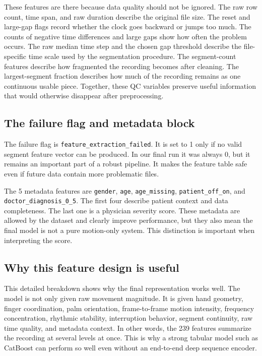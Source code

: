 \documentclass[10pt,twocolumn]{article}
\begin{document}
These features are there because data quality should not be ignored. The raw row count, time span, and raw duration describe the original file size. The reset and large-gap flags record whether the clock goes backward or jumps too much. The counts of negative time differences and large gaps show how often the problem occurs. The raw median time step and the chosen gap threshold describe the file-specific time scale used by the segmentation procedure. The segment-count features describe how fragmented the recording becomes after cleaning. The largest-segment fraction describes how much of the recording remains as one continuous usable piece. Together, these QC variables preserve useful information that would otherwise disappear after preprocessing.

\subsection{The failure flag and metadata block}
The failure flag is \texttt{feature\_extraction\_failed}. It is set to 1 only if no valid segment feature vector can be produced. In our final run it was always 0, but it remains an important part of a robust pipeline. It makes the feature table safe even if future data contain more problematic files.

The 5 metadata features are \texttt{gender}, \texttt{age}, \texttt{age\_missing}, \texttt{patient\_off\_on}, and \texttt{doctor\_diagnosis\_0\_5}. The first four describe patient context and data completeness. The last one is a physician severity score. These metadata are allowed by the dataset and clearly improve performance, but they also mean the final model is not a pure motion-only system. This distinction is important when interpreting the score.

\subsection{Why this feature design is useful}
This detailed breakdown shows why the final representation works well. The model is not only given raw movement magnitude. It is given hand geometry, finger coordination, palm orientation, frame-to-frame motion intensity, frequency concentration, rhythmic stability, interruption behavior, segment continuity, raw time quality, and metadata context. In other words, the 239 features summarize the recording at several levels at once. This is why a strong tabular model such as CatBoost can perform so well even without an end-to-end deep sequence encoder.
\end{document}
